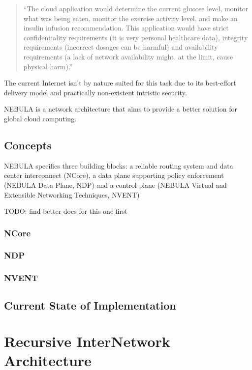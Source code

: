             \begin{quotation}
                ``The cloud application would determine the current glucose level, monitor what was being eaten, monitor the exercise activity level, and make an insulin infusion recommendation. This application would have strict confidentiality requirements (it is very personal healthcare data), integrity requirements (incorrect dosages can be harmful) and availability requirements (a lack of network availability might, at the limit, cause physical harm).''
            \end{quotation}

            The current Internet isn't by nature suited for this task due to its best-effort delivery model and practically non-existent intristic security.

            NEBULA is a network architecture that aims to provide a better solution for global cloud computing.

        \subsection{Concepts}

            NEBULA specifies three building blocks: a reliable routing system and data center interconnect (NCore), a data plane supporting policy enforcement (NEBULA Data Plane, NDP) and a control plane (NEBULA Virtual and Extensible Networking Techniques, NVENT)

            TODO: find better docs for this one first

            \subsubsection{NCore}

            \subsubsection{NDP}

            \subsubsection{NVENT}

        \subsection{Current State of Implementation}


    \section{Recursive InterNetwork Architecture}\label{archs:rina}

